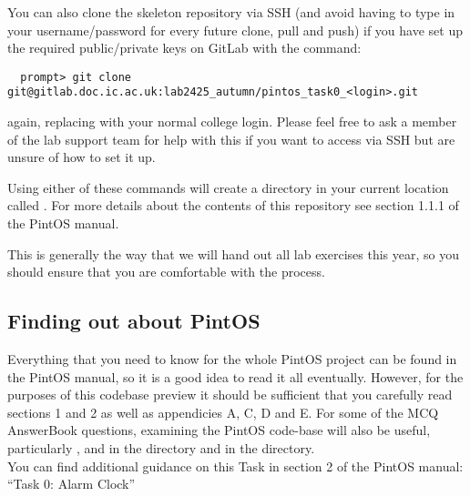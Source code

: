 \documentclass[a4paper,11pt]{article}
\begin{document}
You can also clone the skeleton repository via SSH (and avoid having to type in your username/password for every future clone, pull and push) if you have set up the required public/private keys on GitLab with the command:
%
\begin{verbatim}
  prompt> git clone git@gitlab.doc.ic.ac.uk:lab2425_autumn/pintos_task0_<login>.git
\end{verbatim}
%
again, replacing  with your normal college login.
Please feel free to ask a member of the lab support team for help with this if you want to access  via SSH but are unsure of how to set it up.

Using either of these commands will create a directory in your current location called .
For more details about the contents of this repository see section 1.1.1 of the PintOS manual.

This is generally the way that we will hand out all lab exercises this year, so you should ensure that you are comfortable with the process.


\subsection*{Finding out about PintOS}
Everything that you need to know for the whole PintOS project can be found in the PintOS manual,
so it is a good idea to read it all eventually.
However, for the purposes of this codebase preview it should be sufficient that you carefully read sections 1 and 2 
as well as appendicies A, C, D and E. 
For some of the MCQ AnswerBook questions, examining the PintOS code-base will also be useful,
particularly ,  and  in the  directory
and  in the  directory.\\

\noindent You can find additional guidance on this Task in section 2 of the PintOS manual: ``Task 0: Alarm Clock''
\end{document}
